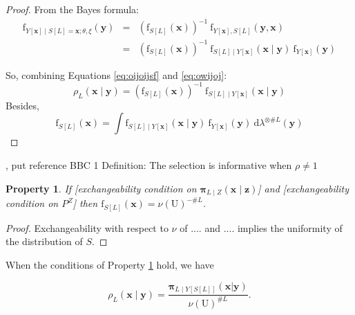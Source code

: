 \documentclass[12pt]{article}
\newtheorem{property}{Property}[section]
\theoremstyle{definition}
\theoremstyle{remark}
\newcommand{\dominantU}{\nu}
\newcommand{\dominantY}{\lambda}
\newcommand{\sampledensity}{\mathbf{\pi}}
\newcommand{\parampop}{\theta}
\newcommand{\paramnuisance}{\xi}
\newcommand{\derive}{\mathrm{d}}
\newcommand{\density}{\mathrm{f}}
\newcommand{\Sample}{S}
\newcommand{\Pop}{\mathrm{U}}
\newcommand{\position}{\mathbf{x}}
\newcommand{\Sampleindex}{L}
\newcommand{\Signal}{Y}
\newcommand{\signal}{\mathbf{y}}
\newcommand{\Desvar}{Z}
\newcommand{\desvar}{\mathbf{z}}
\begin{document}
\begin{proof}
From the Bayes formula:
\begin{eqnarray}
\density_{\Signal[\position]\mid\Sample[\Sampleindex]=\position ;\parampop,\paramnuisance}\left(\signal\right)
&=&(\density_{\Sample[\Sampleindex]}(\position))^{-1}~\density_{\Signal[\position],\Sample[\Sampleindex]}(\signal,\position)\\
&=&(\density_{\Sample[\Sampleindex]}(\position))^{-1}~
\density_{\Sample[\Sampleindex]\mid\Signal[\position]}(\position\mid \signal)~
\density_{\Signal[\position]}(\signal)\label{eq:oijoijsf}
\end{eqnarray}


So, combining Equations \eqref{eq:oijoijsf} and  \eqref{eq:owijoj}:
\begin{equation}
{\rho_{\Sampleindex}\left(\position \mid \signal\right)}
=(\density_{\Sample[\Sampleindex]}(\position))^{-1}
~\density_{\Sample[\Sampleindex]\mid\Signal[\position]}(\position\mid \signal)
\end{equation}
Besides,
\begin{equation}\label{eq:iurhiehgieurhg}
\density_{\Sample[\Sampleindex]}(\position)=
\int \density_{\Sample[\Sampleindex]\mid \Signal[\position]}(\position\mid \signal)~ \density_{\Signal[\position]}(\signal)~
\derive \dominantY^{\otimes \#\Sampleindex}(\signal)
\end{equation}
\end{proof}

\cite{pfefferman_1992}, {\color{red} put reference BBC 1
}
Definition: The selection is informative when $\rho\neq1$


\begin{property}\label{Prop:1}
If 
[exchangeability condition on $\sampledensity_{\Sampleindex\mid \Desvar}(\position\mid \desvar)$] and 
[exchangeability condition on $P^Z$] 
then $\density_{\Sample[\Sampleindex]}(\position)=\dominantU(\Pop)^{-\#\Sampleindex}$.
\end{property}
\begin{proof}
Exchangeability with respect to $\dominantU$ of $....$ and $....$  implies the uniformity of the distribution of $\Sample$.
\end{proof}
When the conditions of Property \ref{Prop:1} hold, we have


\begin{equation}
\rho_{\Sampleindex}\left(\position \mid \signal\right)=
    \frac{\sampledensity_{\Sampleindex\mid \Signal[\Sample[\Sampleindex]]}\left(\position|\signal\right)}
    {\dominantU(\Pop)^{\#\Sampleindex}}.
\end{equation}
\end{document}
